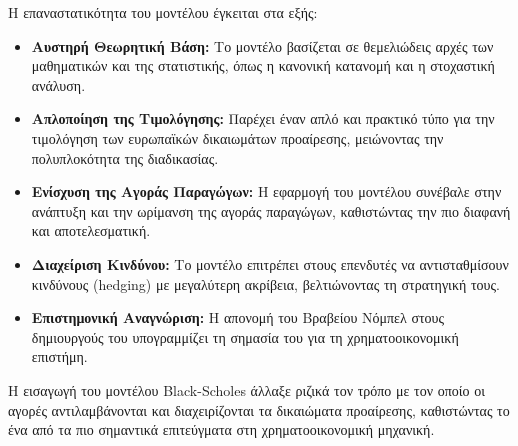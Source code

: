 Η επαναστατικότητα του μοντέλου έγκειται στα εξής:
\begin{itemize}
    \item \textbf{Αυστηρή Θεωρητική Βάση:} Το μοντέλο βασίζεται σε θεμελιώδεις αρχές των μαθηματικών και της στατιστικής, όπως η κανονική κατανομή και η στοχαστική ανάλυση.
    \item \textbf{Απλοποίηση της Τιμολόγησης:} Παρέχει έναν απλό και πρακτικό τύπο για την τιμολόγηση των ευρωπαϊκών δικαιωμάτων προαίρεσης, μειώνοντας την πολυπλοκότητα της διαδικασίας.
    \item \textbf{Ενίσχυση της Αγοράς Παραγώγων:} Η εφαρμογή του μοντέλου συνέβαλε στην ανάπτυξη και την ωρίμανση της αγοράς παραγώγων, καθιστώντας την πιο διαφανή και αποτελεσματική.
    \item \textbf{Διαχείριση Κινδύνου:} Το μοντέλο επιτρέπει στους επενδυτές να αντισταθμίσουν κινδύνους (hedging) με μεγαλύτερη ακρίβεια, βελτιώνοντας τη στρατηγική τους.
    \item \textbf{Επιστημονική Αναγνώριση:} Η απονομή του Βραβείου Νόμπελ στους δημιουργούς του υπογραμμίζει τη σημασία του για τη χρηματοοικονομική επιστήμη.
\end{itemize}

Η εισαγωγή του μοντέλου Black-Scholes άλλαξε ριζικά τον τρόπο με τον οποίο οι αγορές αντιλαμβάνονται και διαχειρίζονται τα δικαιώματα προαίρεσης, καθιστώντας το ένα από τα πιο σημαντικά επιτεύγματα στη χρηματοοικονομική μηχανική.

